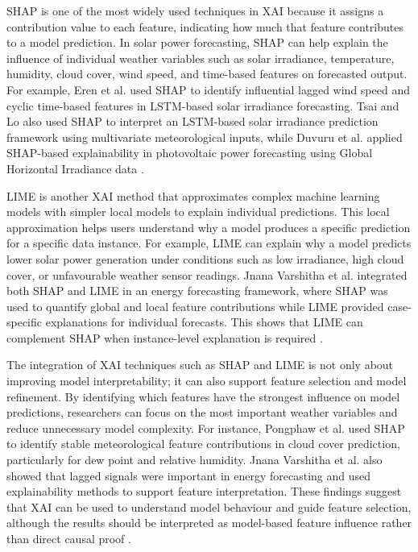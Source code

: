 SHAP is one of the most widely used techniques in XAI because it assigns a contribution value to each feature, indicating how much that feature contributes to a model prediction. In solar power forecasting, SHAP can help explain the influence of individual weather variables such as solar irradiance, temperature, humidity, cloud cover, wind speed, and time-based features on forecasted output. For example, Eren et al. used SHAP to identify influential lagged wind speed and cyclic time-based features in LSTM-based solar irradiance forecasting. Tsai and Lo also used SHAP to interpret an LSTM-based solar irradiance prediction framework using multivariate meteorological inputs, while Duvuru et al. applied SHAP-based explainability in photovoltaic power forecasting using Global Horizontal Irradiance data \parencite{Eren2025, TsaiLo2025, Duvuru2026}.

LIME is another XAI method that approximates complex machine learning models with simpler local models to explain individual predictions. This local approximation helps users understand why a model produces a specific prediction for a specific data instance. For example, LIME can explain why a model predicts lower solar power generation under conditions such as low irradiance, high cloud cover, or unfavourable weather sensor readings. Jnana Varshitha et al. integrated both SHAP and LIME in an energy forecasting framework, where SHAP was used to quantify global and local feature contributions while LIME provided case-specific explanations for individual forecasts. This shows that LIME can complement SHAP when instance-level explanation is required \parencite{JnanaVarshitha2025}.

The integration of XAI techniques such as SHAP and LIME is not only about improving model interpretability; it can also support feature selection and model refinement. By identifying which features have the strongest influence on model predictions, researchers can focus on the most important weather variables and reduce unnecessary model complexity. For instance, Pongphaw et al. used SHAP to identify stable meteorological feature contributions in cloud cover prediction, particularly for dew point and relative humidity. Jnana Varshitha et al. also showed that lagged signals were important in energy forecasting and used explainability methods to support feature interpretation. These findings suggest that XAI can be used to understand model behaviour and guide feature selection, although the results should be interpreted as model-based feature influence rather than direct causal proof \parencite{Pongphaw2025, JnanaVarshitha2025, Eren2025}.

